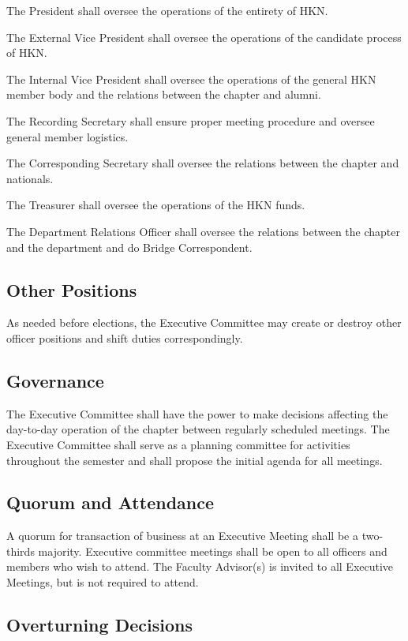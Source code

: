 \documentclass[11pt]{article}
\begin{document}
The President shall oversee the operations of the entirety of HKN.


The External Vice President shall oversee the operations of the candidate process of HKN.
 
The Internal Vice President shall oversee the operations of the general HKN member body and the relations between the chapter and alumni.

The Recording Secretary shall ensure proper meeting procedure and oversee general member logistics.

The Corresponding Secretary shall oversee the relations between the chapter and nationals.

The Treasurer shall oversee the operations of the HKN funds.

The Department Relations Officer shall oversee the relations between the chapter and the department and do Bridge Correspondent.

\subsection{Other Positions}
\label{sec:org306076f}

As needed before elections, the Executive Committee may create or destroy other officer positions and shift duties correspondingly.

\subsection{Governance}
\label{sec:org00f3551}

The Executive Committee shall have the power to make decisions affecting the day-to-day operation of the chapter between regularly scheduled meetings.
The Executive Committee shall serve as a planning committee for activities throughout the semester and shall propose the initial agenda for all meetings.

\subsection{Quorum and Attendance}
\label{sec:orgd5f23dc}

A quorum for transaction of business at an Executive Meeting shall be a two-thirds majority.
Executive committee meetings shall be open to all officers and members who wish to attend.
The Faculty Advisor(s) is invited to all Executive Meetings, but is not required to attend.

\subsection{Overturning Decisions}
\label{sec:orgd2ccda6}
\end{document}
